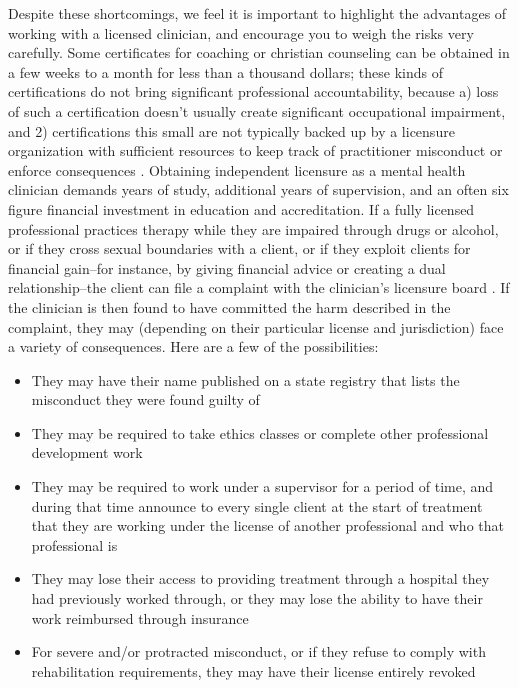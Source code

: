 \documentclass[12pt,letterpaper]{book}
\begin{document}
Despite these shortcomings, we feel it is important to highlight the advantages of working with a licensed clinician, and encourage you to weigh the risks very carefully. Some certificates for coaching or christian counseling can be obtained in a few weeks to a month for less than a thousand dollars; these kinds of certifications do not bring significant professional accountability, because a) loss of such a certification doesn't usually create significant occupational impairment, and 2) certifications this small are not typically backed up by a licensure organization with sufficient resources to keep track of practitioner misconduct or enforce consequences \cite{carr2015end}. Obtaining independent licensure as a mental health clinician demands years of study, additional years of supervision, and an often six figure financial investment in education and accreditation. If a fully licensed professional practices therapy while they are impaired through drugs or alcohol, or if they cross sexual boundaries with a client, or if they exploit clients for financial gain–for instance, by giving financial advice or creating a dual relationship–the client can file a complaint with the clinician's licensure board \cite{vinson1987complaintProcedures,barsky2023licensing}. If the clinician is then found to have committed the harm described in the complaint, they may (depending on their particular license and jurisdiction) face a variety of consequences. Here are a few of the possibilities:
\begin{itemize}
    \item They may have their name published on a state registry that lists the misconduct they were found guilty of
    \item They may be required to take ethics classes or complete other professional development work
    \item They may be required to work under a supervisor for a period of time, and during that time announce to every single client at the start of treatment that they are working under the license of another professional and who that professional is
    \item They may lose their access to providing treatment through a hospital they had previously worked through, or they may lose the ability to have their work reimbursed through insurance 
    \item For severe and/or protracted misconduct, or if they refuse to comply with rehabilitation requirements, they may have their license entirely revoked
\end{itemize}
\end{document}
